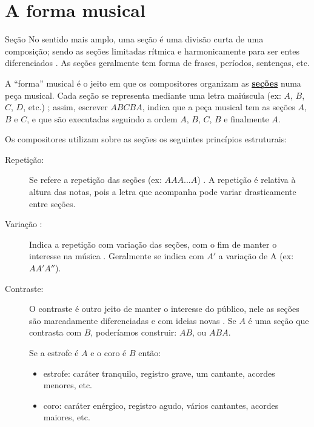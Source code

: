 


\section{A forma musical}
\label{sec:FormaMusical}

\begin{tcbinformation}{Seção}
\label{ref:Secao}
No sentido mais amplo, uma seção é uma divisão curta de uma composição;
sendo as seções limitadas rítmica e harmonicamente para ser entes diferenciados \cite[pp. 174]{baker1895dictionary}.
As seções geralmente tem forma de frases, períodos, sentenças, etc. 
\end{tcbinformation} 

A ``forma'' musical é o jeito em que os compositores organizam as \hyperref[ref:Secao]{\textbf{seções}} numa peça musical.
Cada seção se representa mediante uma letra maiúscula (ex: $A$, $B$, $C$, $D$, etc.) \cite[pp. 71]{bennett1993elementos};
assim, escrever $ABCBA$, indica que a peça musical tem as seções $A$, $B$ e $C$,
e que são executadas seguindo a ordem $A$, $B$, $C$, $B$ e finalmente $A$.


Os compositores utilizam sobre as seções os seguintes princípios estruturais:
\begin{description}
\item[Repetição:] Se refere a repetição das seções (ex: $AAA...A$) 
\cite[pp. 71]{bennett1993elementos} \cite[pp. 88]{howard1991aprendendo} \cite[pp. 53]{colluraimprovisacao} 
\cite[pp. 85]{holland2013music}.
A repetição é relativa à altura das notas, 
pois a letra que acompanha pode variar drasticamente entre seções.
 
\item[Variação :] Indica a repetição com variação das seções, 
 com o fim de manter o interesse na música
\cite[pp. 71]{bennett1993elementos} \cite[pp. 88]{howard1991aprendendo} \cite[pp. 53]{colluraimprovisacao}.
Geralmente se indica com $A'$ a variação de A (ex: $AA'A''$).

\item[Contraste:] O contraste é outro jeito de manter o interesse do 
público, nele as seções são marcadamente diferenciadas e com ideias novas
\cite[pp. 71]{bennett1993elementos} \cite[pp. 88]{howard1991aprendendo} 
\cite[pp. 53]{colluraimprovisacao}  \cite[pp. 85]{holland2013music}.
Se $A$ é uma seção que contrasta com $B$, poderíamos construir: $AB$, ou $ABA$.
\begin{example}
Se a estrofe é $A$ e o coro é $B$ então:
\begin{itemize} 
\item estrofe: caráter tranquilo, registro grave, um cantante, acordes menores, etc.
\item coro: caráter enérgico, registro agudo, vários cantantes, acordes maiores, etc.
\end{itemize}
\end{example}
\end{description} 


